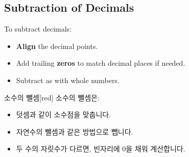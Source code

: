 \documentclass[12pt]{book}
\begin{document}










\twosidedpaper
\subsection{Subtraction of Decimals}

To subtract decimals:
\begin{itemize}
  \item \textbf{Align} the decimal points.  
  \item Add trailing \textbf{zeros} to match decimal places if needed.  
  \item Subtract as with whole numbers.  
\end{itemize}

\begin{flexbox}{소수의 뺄셈}[red]
소수의 뺄셈은:  
\begin{itemize}
  \item 덧셈과 같이 소수점을 맞춥니다.  
  \item 자연수의 뺄셈과 같은 방법으로 뺍니다.  
  \item 두 수의 자릿수가 다르면, 빈자리에 0을 채워 계산합니다.  
\end{itemize}
\end{flexbox}
\end{document}
